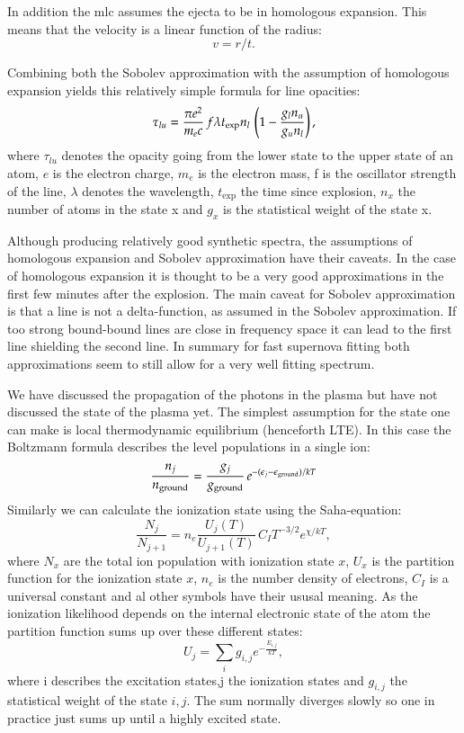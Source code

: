 In addition the \gls{mlc} assumes the ejecta to be in homologous expansion. This means that the velocity is a linear function of the radius:
\[
	v=  r / t.
\]

Combining both the Sobolev approximation with the assumption of homologous expansion yields this relatively simple formula for line opacities:
\[
\tau_{lu} = \frac{\pi e^2}{m_e c}\, f \lambda t_{\rm exp} n_l\, \left(1 - \frac{g_l n_u}{g_u n_l}\right), 
\]
where $\tau_{lu}$ denotes the opacity going from the lower state to the upper state of an atom, $e$ is the electron charge, $m_e$ is the electron mass, f is the oscillator strength of the line, $\lambda$ denotes the wavelength, $t_\textrm{exp}$ the time since explosion, $n_x$ the number of atoms in the state x and $g_x$ is the statistical weight of the state x.

Although producing relatively good synthetic spectra, the assumptions of homologous expansion and Sobolev approximation have their caveats. In the case of homologous expansion it is thought to be a very good approximations in the first few minutes after the explosion. The main caveat for Sobolev approximation is that a line is not a delta-function, as assumed in the Sobolev approximation. If too strong bound-bound lines are close in frequency space it can lead to the first line shielding the second line. In summary for fast supernova fitting both approximations seem to still allow for a very well fitting spectrum.

We have discussed the propagation of the photons in the plasma but have not discussed the state of the plasma yet. The simplest assumption for the state one can make is local thermodynamic equilibrium (henceforth LTE). In this case the Boltzmann formula describes the level populations in a single ion:
\[
\frac{n_j}{n_{\rm ground}} = \frac{g_j}{g_{\rm ground}}\,e^{-(\epsilon_j - \epsilon_{\rm ground})/kT}
\]
Similarly we can calculate the ionization state using the Saha-equation:
\[
	\frac{N_j}{N_{j+1}} = n_e \frac{U_j(T)}{U_{j+1}(T)}\,C_I T^{-3/2} e^{\chi/kT},
\]
where $N_x$ are the total ion population with ionization state $x$, $U_x$ is the partition function for the ionization state $x$, $n_e$ is the number density of electrons, $C_I$ is a universal constant and al other symbols have their ususal meaning. As the ionization likelihood depends on the internal electronic state of the atom the partition function sums up over these different states:
\[
U_j = \sum_i g_{i,j} e^{-\frac{E_{i,j}}{kT}},
\]
where i describes the excitation states,j the ionization states and $g_{i,j}$ the statistical weight of the state $i,j$. 
The sum normally diverges slowly so one in practice just sums up until a highly excited state.

